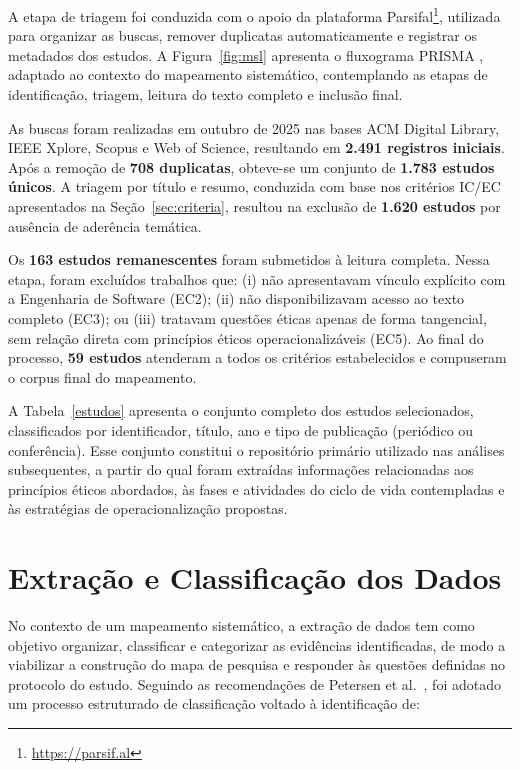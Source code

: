 A etapa de triagem foi conduzida com o apoio da plataforma Parsifal\footnote{\url{https://parsif.al}}, utilizada para organizar as buscas, remover duplicatas automaticamente e registrar os metadados dos estudos. A Figura~\ref{fig:msl} apresenta o fluxograma PRISMA \cite{Page2021}, adaptado ao contexto do mapeamento sistemático, contemplando as etapas de identificação, triagem, leitura do texto completo e inclusão final.



As buscas foram realizadas em outubro de 2025 nas bases ACM Digital Library, IEEE Xplore, Scopus e Web of Science, resultando em \textbf{2.491 registros iniciais}. Após a remoção de \textbf{708 duplicatas}, obteve-se um conjunto de \textbf{1.783 estudos únicos}. A triagem por título e resumo, conduzida com base nos critérios IC/EC apresentados na Seção~\ref{sec:criteria}, resultou na exclusão de \textbf{1.620 estudos} por ausência de aderência temática.

Os \textbf{163 estudos remanescentes} foram submetidos à leitura completa. Nessa etapa, foram excluídos trabalhos que: (i) não apresentavam vínculo explícito com a Engenharia de Software (EC2); (ii) não disponibilizavam acesso ao texto completo (EC3); ou (iii) tratavam questões éticas apenas de forma tangencial, sem relação direta com princípios éticos operacionalizáveis (EC5). Ao final do processo, \textbf{59 estudos} atenderam a todos os critérios estabelecidos e compuseram o corpus final do mapeamento.

A Tabela~\ref{estudos} apresenta o conjunto completo dos estudos selecionados, classificados por identificador, título, ano e tipo de publicação (periódico ou conferência). Esse conjunto constitui o repositório primário utilizado nas análises subsequentes, a partir do qual foram extraídas informações relacionadas aos princípios éticos abordados, às fases e atividades do ciclo de vida contempladas e às estratégias de operacionalização propostas.

\section{Extração e Classificação dos Dados}
\label{sec:data_extraction}

No contexto de um mapeamento sistemático, a extração de dados tem como objetivo organizar, classificar e categorizar as evidências identificadas, de modo a viabilizar a construção do mapa de pesquisa e responder às questões definidas no protocolo do estudo. Seguindo as recomendações de Petersen et al.~\cite{Petersen2015}, foi adotado um processo estruturado de classificação voltado à identificação de:

